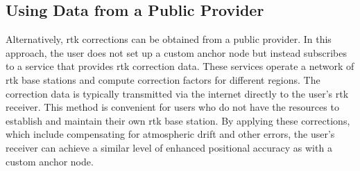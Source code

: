\subsection{Using Data from a Public Provider}
Alternatively, \acrshort{rtk} corrections can be obtained from a public provider.
In this approach, the user does not set up a custom anchor node but instead subscribes to a service that provides \acrshort{rtk} correction data.
These services operate a network of \acrshort{rtk} base stations and compute correction factors for different regions.
The correction data is typically transmitted via the internet directly to the user's \acrshort{rtk} receiver.
This method is convenient for users who do not have the resources to establish and maintain their own \acrshort{rtk} base station.
By applying these corrections, which include compensating for atmospheric drift and other errors,
the user's receiver can achieve a similar level of enhanced positional accuracy as with a custom anchor node.
